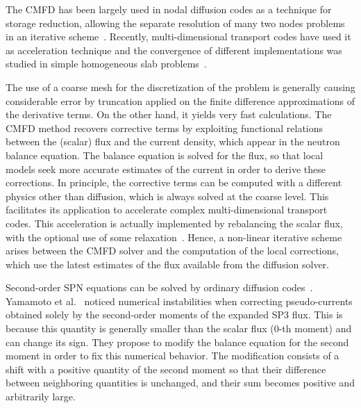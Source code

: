 \documentclass[letterpaper]{physor2020}
\begin{document}

The CMFD has been largely used in nodal diffusion codes as a technique for storage reduction, allowing the separate resolution of many two nodes problems in an iterative scheme~\cite{Smith-1983,Lawrence-1986}. Recently, multi-dimensional transport codes have used it as acceleration technique and the convergence of different implementations was studied in simple homogeneous slab problems~\cite{Jarrett-2016,Shen-2019}.

The use of a coarse mesh for the discretization of the problem is generally causing considerable error by truncation applied on the finite difference approximations of the derivative terms. On the other hand, it yields very fast calculations. The CMFD method recovers corrective terms by exploiting functional relations between the (scalar) flux and the current density, which appear in the neutron balance equation. The balance equation is solved for the flux, so that local models seek more accurate estimates of the current in order to derive these corrections. In principle, the corrective terms can be computed with a different physics other than diffusion, which is always solved at the coarse level. This facilitates its application to accelerate complex multi-dimensional transport codes. This acceleration is actually implemented by rebalancing the scalar flux, with the optional use of some relaxation~\cite{Park-2017}. Hence, a non-linear iterative scheme arises between the CMFD solver and the computation of the local corrections, which use the latest estimates of the flux available from the diffusion solver.

Second-order SPN equations can be solved by ordinary diffusion codes~\cite{Larsen-1993}. Yamamoto et al.~\cite{Yamamoto-2016} noticed numerical instabilities when correcting pseudo-currents obtained solely by the second-order moments of the expanded SP3 flux. This is because this quantity is generally smaller than the scalar flux (0-th moment) and can change its sign. They propose to modify the balance equation for the second moment in order to fix this numerical behavior. The modification consists of a shift with a positive quantity of the second moment so that their difference between neighboring quantities is unchanged, and their sum becomes positive and arbitrarily large.
\end{document}
